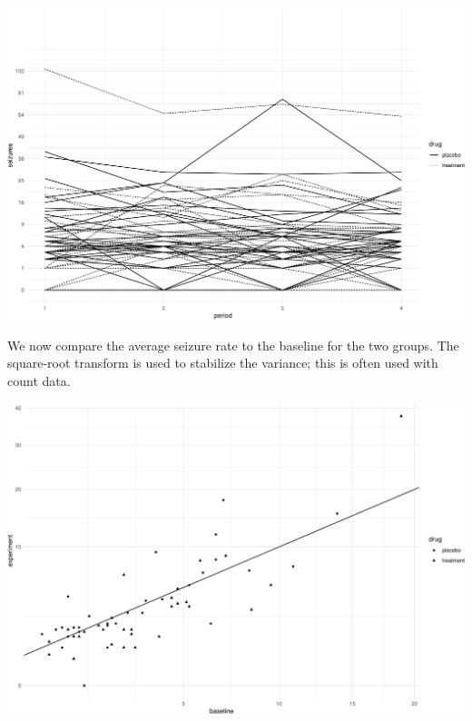 \documentclass[
  ignorenonframetext,
]{beamer}
\begin{document}
\begin{frame}{}
\protect\hypertarget{section-4}{}
\includegraphics{week13p2_files/figure-beamer/unnamed-chunk-4-1.pdf}
\end{frame}

\begin{frame}{}
\protect\hypertarget{section-5}{}
We now compare the average seizure rate to the baseline for the two
groups. The square-root transform is used to stabilize the variance;
this is often used with count data.

\vspace{12pt}

\includegraphics{week13p2_files/figure-beamer/unnamed-chunk-5-1.pdf}
\end{frame}
\end{document}
